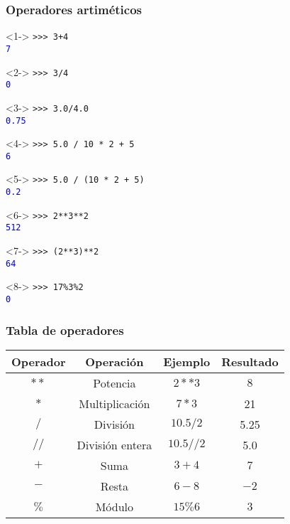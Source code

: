 \documentclass[12pt]{beamer}
\begin{document}
\begin{frame}[fragile]
\frametitle{Operadores artim\'{e}ticos}
\begin{minipage}{5.5cm}
\begin{exampleblock}{}<1->
	\verb|>>> 3+4| \\
	\pause
	\textcolor{blue}{\texttt{7}}
\end{exampleblock}
\begin{exampleblock}{}<2->
	\verb|>>> 3/4| \\
	\pause
	\textcolor{blue}{\texttt{0}}
\end{exampleblock}
\begin{exampleblock}{}<3->
	\verb|>>> 3.0/4.0| \\
	\pause
	\textcolor{blue}{\texttt{0.75}}
\end{exampleblock}
\begin{exampleblock}{}<4->
	\verb|>>> 5.0 / 10 * 2 + 5| \\
	\pause
	\textcolor{blue}{\texttt{6}}
\end{exampleblock}
\end{minipage}
\hspace{0.5cm}
\begin{minipage}{5.5cm}
\begin{exampleblock}{}<5->
	\verb|>>> 5.0 / (10 * 2 + 5)| \\
	\pause
	\textcolor{blue}{\texttt{0.2}}
\end{exampleblock}
\begin{exampleblock}{}<6->
	\verb|>>> 2**3**2| \\
	\pause
	\textcolor{blue}{\texttt{512}}
\end{exampleblock}
\begin{exampleblock}{}<7->
	\verb|>>> (2**3)**2| \\
	\pause
	\textcolor{blue}{\texttt{64}}
\end{exampleblock}
\begin{exampleblock}{}<8->
	\verb|>>> 17%3%2| \\
	\pause
	\textcolor{blue}{\texttt{0}}
\end{exampleblock}
\end{minipage}
\end{frame}
\begin{frame}
\frametitle{Tabla de operadores}
\begin{center}
\begin{tabular}{| c | c | c | c |}
\hline
Operador & Operaci\'{o}n & Ejemplo & Resultado \\
\hline
\hline
$**$ & Potencia & $2**3$ & $8$ \\
$*$ & Multiplicaci\'{o}n & $7*3$ & 21 \\
$/$ & Divisi\'{o}n & $10.5/2$ & 5.25 \\
$//$ & Divisi\'{o}n entera & $10.5//2$ & 5.0 \\
$+$ & Suma & $3+4$ & $7$ \\
$-$ & Resta & $6-8$ & $-2$ \\
$\%$ & M\'{o}dulo & $15\%6$ & $3$ \\
\hline
\end{tabular}
\end{center}
\end{frame}
\end{document}
